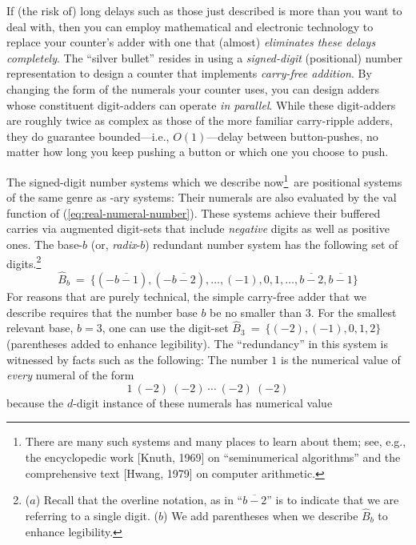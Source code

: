 \medskip

 

If (the risk of) long delays such as those just described is more than you want to deal with, then you can employ mathematical and electronic technology to replace your counter's adder with one that (almost) {\em eliminates these delays completely}.  The ``silver bullet'' resides in using a {\em signed-digit} (positional) number representation to design a counter that implements {\it carry-free addition}.  By changing the form of the numerals your counter uses, you can design adders whose constituent digit-adders can operate {\em in parallel}.  While these digit-adders are roughly twice as complex as those of the more familiar carry-ripple adders, they do guarantee bounded---i.e., $O(1)$---delay between button-pushes, no matter how long you keep
pushing a button or which one you choose to push.

\medskip


The signed-digit number systems which we describe now\footnote{There are many such systems and many places to learn about them; see, e.g., the encyclopedic work [Knuth, 1969] on ``seminumerical algorithms'' and the comprehensive text [Hwang, 1979] on computer arithmetic.}~are positional systems of the same genre as -ary systems: Their numerals are also evaluated by the {\sc val} function of (\ref{eq:real-numeral-number}).  These systems achieve their buffered carries via augmented digit-sets that include {\em negative} digits as well as positive ones.  The base-$b$ (or, {\it radix}-$b$) redundant number system  has the following set of digits.\footnote{($a$) Recall that the overline notation, as in ``$\overline{b-2}$'' is to indicate that we are referring to a single digit.  ($b$) We add parentheses when we describe $\widehat{B}_b$ to enhance legibility.}
\[ \widehat{B}_b \ = \ \{(-\overline{b-1}), (-\overline{b-2}), \ldots,
(-1), 0 , 1, \ldots, \overline{b-2}, \overline{b-1}\}
\]
For reasons that are purely technical, the simple carry-free adder that we describe requires that the number base $b$ be no smaller than $3$.  For the smallest relevant base, $b=3$, one can use the digit-set $\widehat{B}_3 \ = \ \{ (-2), (-1), 0, 1, 2\}$ (parentheses added to enhance legibility).  The ``redundancy'' in this system is witnessed by facts such as the following:  The number $1$ is the numerical value of {\em every} numeral of the form
\[ 1 \ (-2) \ (-2) \ \cdots \ (-2) \ (-2) \]
because the $d$-digit instance of these numerals has numerical value

